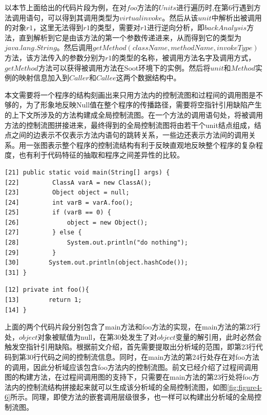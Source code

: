 以本节上面给出的代码片段为例，在对$foo$方法的$Units$进行遍历时,在第6行遇到方法调用语句，可以得到其调用类型为$virtualinvoke$。然后从该$unit$中解析出被调用的对象$r1$，这里无法得到$r1$的类型，需要对$r1$进行逆向分析，即$backAnalysis$方法，直到解析到它是由该方法的第一个参数传递进来，从而得到它的类型为$java.lang.String$。然后调用$getMethod(className,methodName,invokeType)$方法，该方法传入的参数分别为$r1$的类型的名称，被调用方法名字及调用方式，$getMethod$方法可以获得被调用方法在Soot环境下的实例。然后将$unit$和$Method$实例的映射信息加入到$Caller$和$Callee$这两个数据结构中。

本文需要将一个程序的结构刻画出来只用方法内的控制流图和过程间的调用图是不够的，为了形象地反映Null值在整个程序的传播路径，需要将空指针引用缺陷产生的上下文所涉及的方法构建成全局控制流图。在一个方法的调用语句处，将被调用方法的控制流图拼接进来，最终得到的全局控制流图将由若干个unit结点组成，结点之间的边表示不仅表示方法内语句的跳转关系，一些边还表示方法间的调用关系。用一张图表示整个程序的控制流结构有利于反映直观地反映整个程序的复杂程度，也有利于代码特征的抽取和程序之间差异性的比较。

\begin{lstlisting}[language={[AspectJ]Java},keywordstyle=\color{blue!70},commentstyle=\color{red!50!green!50!blue!50},frame=shadowbox, rulesepcolor=\color{red!20!green!20!blue!20}] 
[21] public static void main(String[] args) {
[22]         ClassA varA = new ClassA();
[23]         Object object = null;
[24]         int varB = varA.foo();
[25]         if (varB == 0) {
[26]             object = new Object();
[27]         } else {
[28]             System.out.println("do nothing");
[29]         }
[30]        System.out.println(object.hashCode());
[31] }
\end{lstlisting}

\begin{lstlisting}[language={[AspectJ]Java},keywordstyle=\color{blue!70},commentstyle=\color{red!50!green!50!blue!50},frame=shadowbox, rulesepcolor=\color{red!20!green!20!blue!20}] 
[12] private int foo(){
[13]        return 1;
[14] }
\end{lstlisting}

上面的两个代码片段分别包含了main方法和foo方法的实现，在main方法的第23行处，$object$对象被赋值为null，在第30处发生了对$object$变量的解引用，此时必然会触发空指针引用缺陷。根据前文介绍，首先需要提取出分析域的范围，即第23行代码到第30行代码之间的控制流信息。同时，在main方法的第24行处存在对foo方法的调用，因此分析域应该包含foo方法内的控制流图。前文已经介绍了过程间调用图的构建方法，在过程间调用图的支持下，只需要在main方法的第23行处将foo方法内的控制流结构拼接起来就可以生成该分析域的全局控制流图，如图\ref{fig:figure4-6}所示。同理，即使方法的嵌套调用层级很多，也一样可以构建出分析域的全局控制流图。

